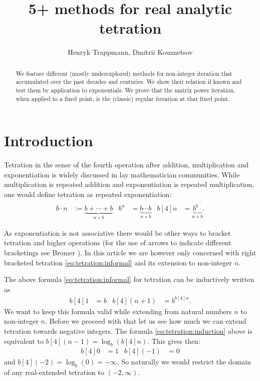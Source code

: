 \documentclass{article}
\author{Henryk Trappmann, Dmitrii Kouznetsov}
\title{5+ methods for real analytic tetration}
\numberwithin{equation}{section}
\begin{document}
\maketitle
\begin{abstract}
We feature different (mostly underexplored) methods for non-integer
iteration that accumulated over the past decades and
centuries. We show their relation if known and test them by
application to exponentials. 
We prove that the matrix power iteration, when applied to a fixed point, is the
(classic) regular iteration at that fixed point.
\end{abstract}

\section{Introduction}
Tetration in the sense of the fourth operation after addition,
multiplication and exponentiation is widely discussed in lay
mathematician communities. While multiplication is repeated addition
and exponentiation is repeated multiplication, one would define
tetration as repeated exponentiation: 
\newcommand{\tet}{\operatorname{[4]}}
\begin{align}\label{eq:tetration:informal}
  b\cdot n &:= \underbrace{b + \dotsb + b}_{n\times b}&
  b^n &= \underbrace{b\dotsm b}_{n\times b}&
  b\tet n &= \underbrace{b^{b^{.^{.^{.^b}}}}}_{n\times b}.
\end{align}

As exponentiation is not associative there would be other ways to
bracket tetration and higher operations (for the use of arrows to
indicate different 
bracketings see Bromer \cite{bromer:superexponentiation}). In this article we are
however only concerned with right bracketed tetration
\eqref{eq:tetration:informal} and its extension to non-integer $n$.

The above formula \eqref{eq:tetration:informal} for tetration can be
inductively written as 
\begin{align}\label{eq:tetration:induction}
  b\tet 1 &= b &b\tet (n+1) &= b^{b\tet n}.
\end{align}
We want to keep this formula valid while extending from natural
numbers $n$ to non-integer $n$. Before we proceed with that let us see how
much we can extend tetration towards negative integers. The formula
\eqref{eq:tetration:induction} above is equivalent to $b\tet
(n-1)=\log_b (b\tet n)$. This gives then:
\begin{align}
  b\tet 0 &= 1 & b\tet (-1) &= 0
\end{align}
and $b\tet (-2)=\log_b(0)=-\infty$. So naturally we would restrict the
domain of any real-extended tetration to $(-2,\infty)$.
\end{document}
